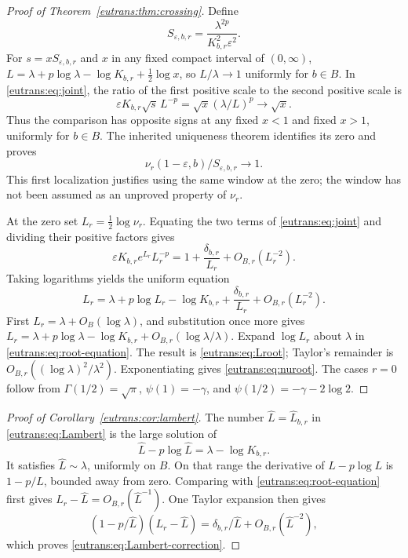 \begin{proof}[Proof of Theorem~\ref{eutrans:thm:crossing}]
Define
\[
 S_{\varepsilon,b,r}=
        \frac{\lambda^{2p}}{K_{b,r}^2\varepsilon^2}.
\]
For $s=xS_{\varepsilon,b,r}$ and $x$ in any fixed compact interval
of $(0,\infty)$, $L=\lambda+p\log\lambda-\log K_{b,r}
+\tfrac12\log x$, so $L/\lambda\to1$ uniformly for $b\in B$.
In \eqref{eutrans:eq:joint}, the ratio of the first positive scale
to the second positive scale is
\[
 \varepsilon K_{b,r}\sqrt{s}\,L^{-p}
                =\sqrt{x}(\lambda/L)^p\longrightarrow\sqrt{x}.
\]
Thus the comparison has opposite signs at any fixed $x<1$ and
fixed $x>1$, uniformly for $b\in B$. The inherited uniqueness
theorem identifies its zero and proves
\[
 \nu_r(1-\varepsilon,b)/S_{\varepsilon,b,r}\longrightarrow1.
\]
This first localization justifies using the same window at the zero;
the window has not been assumed as an unproved property of $\nu_r$.

At the zero set $L_r=\tfrac12\log\nu_r$. Equating the two terms
of \eqref{eutrans:eq:joint} and dividing their positive factors gives
\[
 \varepsilon K_{b,r}e^{L_r}L_r^{-p}
       =1+\frac{\delta_{b,r}}{L_r}+O_{B,r}(L_r^{-2}).
\]
Taking logarithms yields the uniform equation
\begin{equation}\label{eutrans:eq:root-equation}
 L_r=\lambda+p\log L_r-\log K_{b,r}
                +\frac{\delta_{b,r}}{L_r}+O_{B,r}(L_r^{-2}).
\end{equation}
First $L_r=\lambda+O_B(\log\lambda)$, and substitution once more
gives $L_r=\lambda+p\log\lambda-\log K_{b,r}
+O_{B,r}(\log\lambda/\lambda)$. Expand $\log L_r$ about
$\lambda$ in \eqref{eutrans:eq:root-equation}. The result is
\eqref{eutrans:eq:Lroot}; Taylor's remainder is
$O_{B,r}((\log\lambda)^2/\lambda^2)$. Exponentiating gives
\eqref{eutrans:eq:nuroot}. The cases $r=0$ follow from
$\Gamma(1/2)=\sqrt\pi$, $\psi(1)=-\gamma$, and
$\psi(1/2)=-\gamma-2\log2$.
\end{proof}

\begin{proof}[Proof of Corollary~\ref{eutrans:cor:lambert}]
The number $\widehat L=\widehat L_{b,r}$ in
\eqref{eutrans:eq:Lambert} is the large solution of
\[
 \widehat L-p\log\widehat L=\lambda-\log K_{b,r}.
\]
It satisfies $\widehat L\sim\lambda$, uniformly on $B$.
On that range the derivative of $L-p\log L$ is
$1-p/L$, bounded away from zero. Comparing with
\eqref{eutrans:eq:root-equation} first gives
$L_r-\widehat L=O_{B,r}(\widehat L^{-1})$. One Taylor expansion
then gives
\[
 (1-p/\widehat L)(L_r-\widehat L)
     =\delta_{b,r}/\widehat L+O_{B,r}(\widehat L^{-2}),
\]
which proves \eqref{eutrans:eq:Lambert-correction}.
\end{proof}

